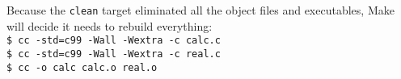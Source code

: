 \begin{enumerate}
\begin{answer}
Because the \texttt{clean} target eliminated all the object files and executables, Make will decide it needs to rebuild everything: \\
\texttt{\$ cc -std=c99 -Wall -Wextra -c calc.c} \\
\texttt{\$ cc -std=c99 -Wall -Wextra -c real.c} \\
\texttt{\$ cc -o calc calc.o real.o}
\end{answer}
\end{enumerate}
